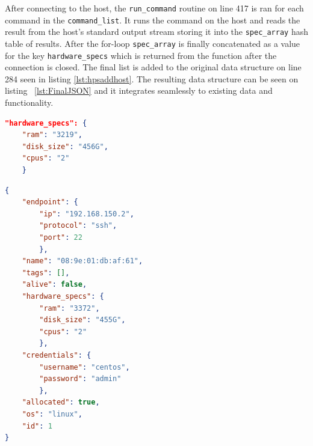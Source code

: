 After connecting to the host, the \verb|run_command| routine on line 417 is ran for each command in the \verb|command_list|. It runs the command on the host and reads the result from the host's standard output stream storing it into the \verb|spec_array| hash table of results. After the for-loop \verb|spec_array| is finally concatenated as a value for the key \verb|hardware_specs| which is returned from the function after the connection is closed. The final list is added to the original data structure on line 284 seen in listing \ref{lst:hpsaddhost}. The resulting data structure can be seen on listing ~\ref{lst:FinalJSON} and it integrates seamlessly to existing data and functionality.

\begin{lstlisting}[language=json,firstnumber=1, caption={An example of additional data inserted by the Specification Retriever}, captionpos=b, label=lst:JSONSpecs]
"hardware_specs": {
	"ram": "3219", 
	"disk_size": "456G", 
	"cpus": "2"
	}
\end{lstlisting}

\begin{lstlisting}[language=json, firstnumber=1, caption={An example of final data structure after the Specification Retriever has inserted hardware data}, captionpos=b, label=lst:FinalJSON]
{
	"endpoint": {
		"ip": "192.168.150.2", 
		"protocol": "ssh", 
		"port": 22
		},
	"name": "08:9e:01:db:af:61", 
	"tags": [], 
	"alive": false, 
	"hardware_specs": {
		"ram": "3372", 
		"disk_size": "455G", 
		"cpus": "2"
		}, 
	"credentials": {
		"username": "centos", 
		"password": "admin"
		}, 
	"allocated": true, 
	"os": "linux", 
	"id": 1
}

\end{lstlisting}
